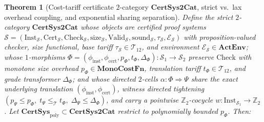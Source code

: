 \documentclass[11pt]{article}
\theoremstyle{plain}
\newtheorem{theorem}{Theorem}[section]
\theoremstyle{definition}
\begin{document}
\begin{theorem}[Cost-tariff certificate $2$-category $\mathbf{CertSys2Cat}$, strict vs.\ lax overhead coupling, and exponential sharing separation]\label{thm:cert-sys-2cat-and-sharing}
Define the strict $2$-category $\mathbf{CertSys2Cat}$ whose objects are certified proof systems $\mathcal{S} = (\mathrm{Inst}_{\mathcal{S}}, \mathrm{Cert}_{\mathcal{S}}, \mathrm{Check}_{\mathcal{S}}, \mathrm{size}_{\mathcal{S}}, \mathrm{Valid}_{\mathcal{S}}, \mathrm{sound}_{\mathcal{S}}, \tau_{\mathcal{S}}, \mathcal{E}_{\mathcal{S}})$ with proposition-valued checker, size functional, base tariff $\tau_{\mathcal{S}} \in \mathcal{T}_{12}$, and environment $\mathcal{E}_{\mathcal{S}} \in \mathbf{ActEnv}$; whose $1$-morphisms $\Phi = (\phi_{\mathrm{inst}}, \phi_{\mathrm{cert}}, p_\Phi, t_\Phi, \Delta_\Phi) : \mathcal{S}_1 \to \mathcal{S}_2$ preserve $\mathrm{Check}$ with monotone size overhead $p_\Phi \in \mathbf{MonoCostFn}$, translation tariff $t_\Phi \in \mathcal{T}_{12}$, and grade transformer $\Delta_\Phi$; and whose directed $2$-cells $\alpha : \Phi \Rightarrow \Psi$ share the exact underlying translation $(\phi_{\mathrm{inst}}, \phi_{\mathrm{cert}})$, witness directed tightening $(p_\Psi \le p_\Phi,\; t_\Psi \le_{\mathcal{T}} t_\Phi,\; \Delta_\Psi \le \Delta_\Phi)$, and carry a pointwise $\mathbb{Z}_2$-cocycle $w : \mathrm{Inst}_{\mathcal{S}_1} \to \mathbb{Z}_2$. Let $\mathbf{CertSys}_{\mathrm{poly}} \subset \mathbf{CertSys2Cat}$ restrict to polynomially bounded $p_\Phi$. Then:
\begin{enumerate}[nosep,label=(\roman*)]

\end{enumerate}
\end{theorem}
\end{document}
